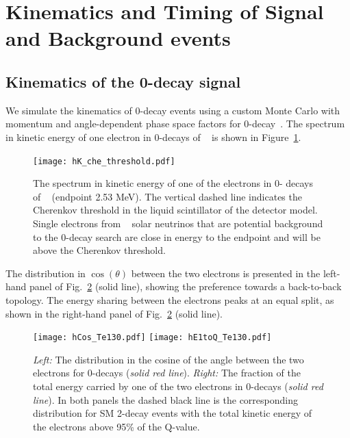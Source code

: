 \section{Kinematics and Timing of Signal and Background events}
\label{sec:kinematics_and_timing}


\subsection{Kinematics of the 0\nbb-decay signal}

We simulate the kinematics of 0\nbb-decay events using a custom Monte
Carlo with momentum and angle-dependent phase space
factors for 0\nbb-decay~\cite{Jenni}.  The spectrum in kinetic energy
of one electron in 0\nbb-decays of \Te~ is shown in
Figure~\ref{fig:Energy_spectrum}.

\begin{figure}[ht]
  \centering
  \texttt{[image: hK\_che\_threshold.pdf]}
  \caption{The spectrum in kinetic energy of one of the electrons in 0\nbb-
  decays of \Te~ (endpoint 2.53 MeV). The vertical dashed line
  indicates the Cherenkov threshold in the liquid scintillator of the
  detector model. Single electrons from \B~ solar neutrinos that are
  potential background to the 0\nbb-decay search are close in energy to the
  endpoint and will be above the Cherenkov threshold.}
 \label{fig:Energy_spectrum}
\end{figure}


The distribution in
$\cos{(\theta)}$ between the two electrons is presented in the left-hand
panel of Fig.~\ref{fig:Kinematics} (solid line), showing the
preference towards a back-to-back topology.  The energy sharing between
the electrons peaks at an equal split, as shown in the right-hand
panel of Fig.~\ref{fig:Kinematics} (solid line).

\begin{figure}[ht]
  \centering
  \texttt{[image: hCos\_Te130.pdf]}
  \texttt{[image: hE1toQ\_Te130.pdf]}
  \caption{\emph{Left:} The distribution in the cosine of the angle
      between the two electrons for 0\nbb-decays (\emph{solid red line}).
      \emph{Right:} The fraction of the total energy carried by one of
      the two electrons in 0\nbb-decays (\emph{solid red line}).  In both
      panels the dashed black line is the corresponding distribution for
      SM 2\nbb-decay events with the total kinetic energy of the electrons
      above 95\% of the Q-value.}
  \label{fig:Kinematics}
\end{figure}

